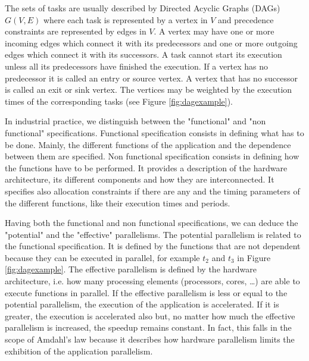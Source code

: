 The sets of tasks are usually described by Directed Acyclic Graphs (DAGs) $G(V,E)$ where each task is represented by a vertex in $V$ and precedence constraints are represented by edges in $V$. A vertex may have one or more incoming edges which connect it with its predecessors and one or more outgoing edges which connect it with its successors. A task cannot start its execution unless all its predecessors have finished the execution. If a vertex has no predecessor it is called an entry or source vertex. A vertex that has no successor is called an exit or sink vertex. The vertices may be weighted by the execution times of the corresponding tasks (see Figure \ref{fig:dagexample}).


In industrial practice, we distinguish between the "functional" and "non functional" specifications. Functional specification consists in defining what has to be done. Mainly, the different functions of the application and the dependence between them are specified. Non functional specification consists in defining how the functions have to be performed. It provides a description of the hardware architecture, its different components and how they are interconnected. It specifies also allocation constraints if there are any and the timing parameters of the different functions, like their execution times and periods.

Having both the functional and non functional specifications, we can deduce the "potential" and the "effective" parallelisms. The potential parallelism is related to the functional specification. It is defined by the functions that are not dependent because they can be executed in parallel, for example $t_2$ and $t_3$ in Figure \ref{fig:dagexample}. The effective parallelism is defined by the hardware architecture, i.e. how many processing elements (processors, cores, \ldots) are able to execute functions in parallel. If the effective parallelism is less or equal to the potential parallelism, the execution of the application is accelerated. If it is greater, the execution is accelerated also but, no matter how much the effective parallelism is increased, the speedup remains constant. In fact, this falls in the scope of Amdahl's law because it describes how hardware parallelism limits the exhibition of the application parallelism.

